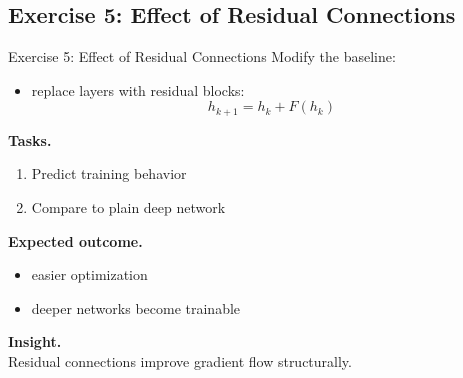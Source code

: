 \documentclass[aspectratio=169,11pt]{beamer}
\begin{document}
\subsection{Exercise 5: Effect of Residual Connections}
\begin{frame}[t,allowframebreaks]{Exercise 5: Effect of Residual Connections}
\small
Modify the baseline:

\begin{itemize}
    \item replace layers with residual blocks:
    \[
    h_{k+1} = h_k + F(h_k)
    \]
\end{itemize}

\textbf{Tasks.}\\ \begin{enumerate}
    \item Predict training behavior
    \item Compare to plain deep network
\end{enumerate}

\textbf{Expected outcome.}\\ \begin{itemize}
    \item easier optimization
    \item deeper networks become trainable
\end{itemize}

\textbf{Insight.}\\ Residual connections improve gradient flow structurally.
\end{frame}
\end{document}
